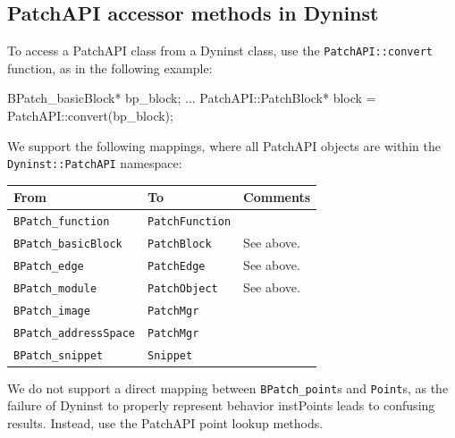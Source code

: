 \subsection{PatchAPI accessor methods in Dyninst}

To access a PatchAPI class from a Dyninst class, use
the \texttt{PatchAPI::convert} function, as in the following example:

\begin{apient}
  BPatch_basicBlock* bp_block;
  ...
  PatchAPI::PatchBlock* block = PatchAPI::convert(bp_block);
\end{apient}

We support the following mappings, where all PatchAPI objects
are within the \texttt{Dyninst::PatchAPI} namespace:

\begin{tabular}{|l|l|l|}
\hline
From & To & Comments \\
\hline
\texttt{BPatch\_function} & \texttt{PatchFunction} & \\
\texttt{BPatch\_basicBlock} & \texttt{PatchBlock} & See above. \\
\texttt{BPatch\_edge} & \texttt{PatchEdge} & See above. \\
\texttt{BPatch\_module} & \texttt{PatchObject} & See above. \\
\texttt{BPatch\_image} & \texttt{PatchMgr} & \\
\texttt{BPatch\_addressSpace} & \texttt{PatchMgr} & \\
\texttt{BPatch\_snippet} & \texttt{Snippet} & \\
\hline
\end{tabular}

We do not support a direct mapping between \texttt{BPatch\_point}s
and \texttt{Point}s, as the failure of Dyninst to properly represent
behavior instPoints leads to confusing results. Instead, use
the PatchAPI point lookup methods.


